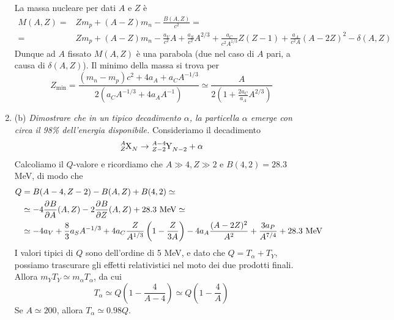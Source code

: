 \documentclass{article}
\renewcommand{\b}{(b)}
\renewcommand{\t}[1]{\textit{ #1}}
\begin{document}
\begin{enumerate}
La massa nucleare per dati $A$ e $Z$ è
\begin{align*}M(A,Z)=&Zm_p+(A-Z)m_n-\frac{B(A,Z)}{c^2}=\\=&Zm_p+(A-Z)m_n-\frac{a_V}{c^2}A+\frac{a_S}{c^2}A^{2/3}+\frac{a_C}{c^2A^{1/3}}Z(Z-1)+\frac{a_A}{c^2A}(A-2Z)^2-\delta(A,Z)\end{align*}
Dunque ad $A$ fissato $M(A,Z)$ è una parabola (due nel caso di $A$ pari, a causa di $\delta(A,Z)$). Il minimo della massa si trova per 
\[Z_\textrm{min}=\frac{(m_n-m_p)c^2+4a_A+a_CA^{-1/3}}{2\left(a_CA^{-1/3}+4a_AA^{-1}\right)}\simeq\frac{A}{2\left(1+\frac{2a_C}{a_A}A^{2/3}\right)}\]
\item\b\t{Dimostrare che in un tipico decadimento $\alpha$, la particella $\alpha$ emerge con circa il
	98\% dell'energia disponibile.}
Consideriamo il decadimento
\[\tensor*[^A_Z]{\textrm{X}}{_N}\to\tensor*[^{A-4}_{Z-2}]{\textrm{Y}}{_{N-2}}+\alpha\]
Calcoliamo il $Q$-valore e ricordiamo che $A\gg 4,Z\gg 2$ e $B(4,2)=28.3$ MeV, di modo che
\begin{align*}
	Q&=B(A-4,Z-2)-B(A,Z)+B(4,2)\simeq\\&\simeq-4\dfrac{\partial ^{}B}{\partial {A}^{}}(A,Z)-2\dfrac{\partial ^{}B}{\partial {Z}^{}}(A,Z)+28.3\textrm{ MeV}\simeq\\&\simeq-4a_V+\frac{8}{3}a_SA^{-1/3}+4a_C\frac{Z}{A^{1/3}}\left(1-\frac{Z}{3A}\right)-4a_A\frac{(A-2Z)^2}{A^2}+\frac{3a_P}{A^{7/4}}+28.3\textrm{ MeV}
\end{align*}
I valori tipici di $Q$ sono dell'ordine di 5 MeV, e dato che $Q=T_\alpha+T_Y$, possiamo trascurare gli effetti relativistici nel moto dei due prodotti finali. Allora $m_YT_Y\simeq m_\alpha T_\alpha$, da cui
\[T_\alpha\simeq Q\left(1-\frac{4}{A-4}\right)\simeq Q\left(1-\frac{4}{A}\right)\]
Se $A\simeq200$, allora $T_\alpha\simeq0.98Q$. 
\end{enumerate}
\end{document}
